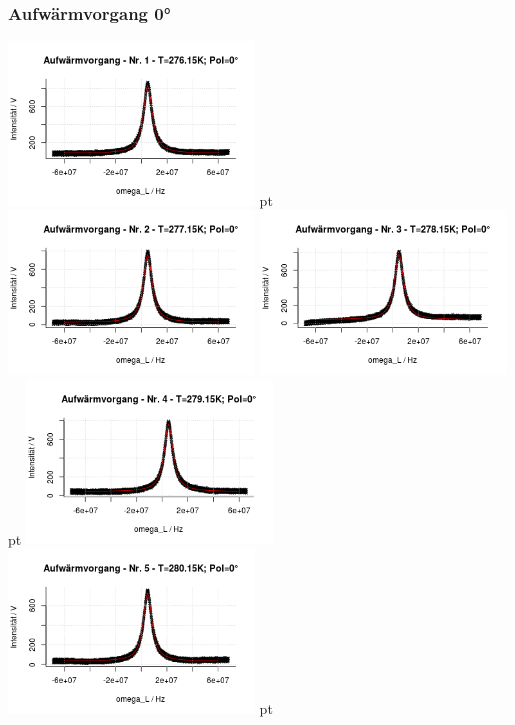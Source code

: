 \documentclass[12pt]{article}
\begin{document}
\subsubsection{Aufwärmvorgang 0°}
\begin{minipage}[h!]{\textwidth}
	\centering
	\includegraphics[width=0.49\textwidth]{figures/warm0-1.png} pt
	\includegraphics[width=0.49\textwidth]{figures/warm0-2.png}\vskip -10pt
	\includegraphics[width=0.49\textwidth]{figures/warm0-3.png} pt
	\includegraphics[width=0.49\textwidth]{figures/warm0-4.png}\vskip -10pt
	\includegraphics[width=0.49\textwidth]{figures/warm0-5.png} pt

\end{minipage}
\end{document}

